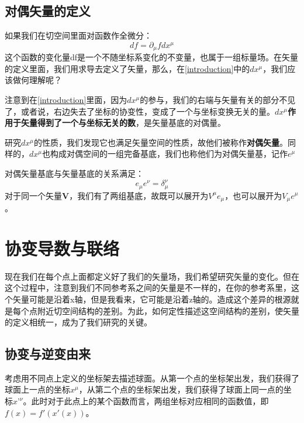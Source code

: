 \documentclass[UTF-8]{article}
\begin{document}
\subsection{对偶矢量的定义}
如果我们在切空间里面对函数作全微分：
\begin{equation}
	df = \partial_{\mu} f d x^{\mu}
	\label{introduction}
\end{equation}
这个函数的变化量df是一个不随坐标系变化的不变量，也属于一组标量场。在矢量的定义里面，我们用求导去定义了矢量，那么，在\ref{introduction}中的$dx^{\mu}$，我们应该做何理解呢？

注意到在\ref{introduction}里面，因为$dx^{\mu}$的参与，我们的右端与矢量有关的部分不见了，或者说，右边失去了坐标的协变性，变成了一个与坐标变换无关的量。\textbf{$dx^{\mu}$作用于矢量得到了一个与坐标无关的数}，是矢量基底的对偶量。

研究$dx^{\mu}$的性质，我们发现它也满足矢量空间的性质，故他们被称作\textbf{对偶矢量}。同样的，$dx^{\mu}$也构成对偶空间的一组完备基底，我们也称他们为对偶矢量基，记作$e^{\mu}$

对偶矢量基底与矢量基底的关系满足：
\begin{equation}
	e_{\mu} e^{\nu} = \delta_{\mu}^{\nu}
\end{equation}
对于同一个矢量$\mathbf{V}$，我们有了两组基底，故既可以展开为$V^{\mu} e_{\mu}$，也可以展开为$V_{\mu} e^{\mu}$。


\section{协变导数与联络}
现在我们在每个点上面都定义好了我们的矢量场，我们希望研究矢量的变化。但在这个过程中，注意到我们不同参考系之间的矢量是不一样的，在你的参考系里，这个矢量可能是沿着x轴，但是我看来，它可能是沿着z轴的。造成这个差异的根源就是每个点附近切空间结构的差别。为此，如何定性描述这空间结构的差别，使矢量的定义相统一，成为了我们研究的关键。


\subsection{协变与逆变由来}
考虑用不同点上定义的坐标架去描述球面。从第一个点的坐标架出发，我们获得了球面上一点的坐标$x^{\mu}$，从第二个点的坐标架出发，我们获得了球面上同一点的坐标$x’^{\nu}$。此时对于此点上的某个函数而言，两组坐标对应相同的函数值，即$f(x) = f'(x'(x))$。
\end{document}
